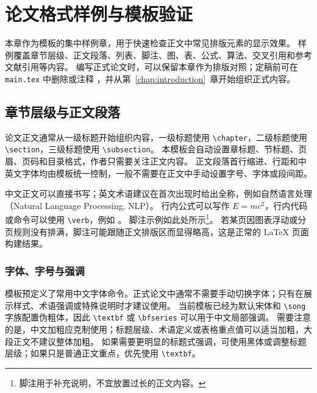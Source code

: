 \chapter{论文格式样例与模板验证}

本章作为模板的集中样例章，用于快速检查正文中常见排版元素的显示效果。
样例覆盖章节层级、正文段落、列表、脚注、图、表、公式、算法、交叉引用和参考文献引用等内容。
编写正式论文时，可以保留本章作为排版对照；定稿前可在 \texttt{main.tex} 中删除或注释 \verb||，并从第~\ref{chap:introduction}~章开始组织正式内容。

\section{章节层级与正文段落}

论文正文通常从一级标题开始组织内容，一级标题使用 \verb|\chapter|，二级标题使用 \verb|\section|，三级标题使用 \verb|\subsection|。
本模板会自动设置章标题、节标题、页眉、页码和目录格式，作者只需要关注正文内容。
正文段落首行缩进、行距和中英文字体均由模板统一控制，一般不需要在正文中手动设置字号、字体或段间距。

中文正文可以直接书写；英文术语建议在首次出现时给出全称，例如自然语言处理（Natural Language Processing, NLP）。
行内公式可以写作 $E=mc^2$，行内代码或命令可以使用 \verb|\verb|，例如 \verb||。
脚注示例如此处所示\footnote{脚注用于补充说明，不宜放置过长的正文内容。}。
若某页因图表浮动或分页规则没有排满，脚注可能跟随正文排版区而显得略高，这是正常的 LaTeX 页面构建结果。

\subsection{字体、字号与强调}

模板预定义了常用中文字体命令。正式论文中通常不需要手动切换字体；只有在展示样式、术语强调或特殊说明时才建议使用。
当前模板已经为默认宋体和 \verb|\song| 字族配置伪粗体，因此 \verb|\textbf| 或 \verb|\bfseries| 可以用于中文局部强调。
需要注意的是，中文加粗应克制使用；标题层级、术语定义或表格重点值可以适当加粗，大段正文不建议整体加粗。
如果需要更明显的标题式强调，可使用黑体或调整标题层级；如果只是普通正文重点，优先使用 \verb|\textbf|。

